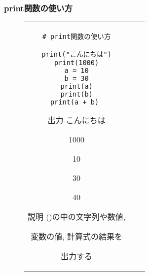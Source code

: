\documentclass{jsarticle}
\begin{document}
\subsubsection{print関数の使い方} \vspace{-5mm}
\begin{figure}[h]
	\begin{tabular}{ccc}
		\begin{minipage}[t]{.4\textwidth}
			\begin{lstlisting}[caption=print関数]
# print関数の使い方

print("こんにちは")
print(1000)
a = 10
b = 30
print(a)
print(b)
print(a + b) \end{lstlisting}
		\end{minipage} \hspace{5mm}
		\begin{minipage}[t]{.15\textwidth}
			\begin{itembox}[l]{出力}
				こんにちは \par
				1000 \par
				10 \par
				30 \par
				40 \par
			\end{itembox}
		\end{minipage} \hspace{5mm}
		\begin{minipage}[t]{.3\textwidth}
			\begin{itembox}[l]{説明}
				()の中の文字列や数値, \par 変数の値, 計算式の結果を \par
				出力する
			\end{itembox}
		\end{minipage}
	\end{tabular}
\end{figure}
\end{document}
